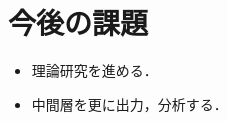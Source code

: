 \documentclass[a4paper,10pt]{jsarticle}
\begin{document}



\section{今後の課題}
\begin{itemize}
 \item 理論研究を進める．
 \item 中間層を更に出力，分析する．
\end{itemize}
\end{document}
